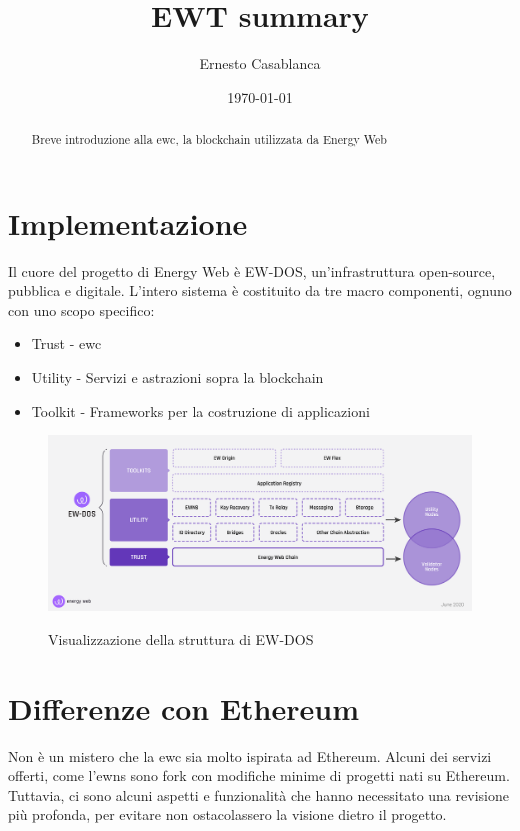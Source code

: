 \documentclass[12pt, letterpaper, twoside]{article}
\title{EWT summary}
\author{Ernesto Casablanca}
\date{\today}
\begin{document}
 
 
\tableofcontents
 
\newpage
 
\begin{abstract}
    Breve introduzione alla \gls{ewc}, la blockchain utilizzata da Energy Web
\end{abstract}

\section{Implementazione}
Il cuore del progetto di Energy Web è EW-DOS, un'infrastruttura open-source, pubblica e digitale.
L'intero sistema è costituito da tre macro componenti, ognuno con uno scopo specifico:

\begin{itemize}
    \item Trust - \gls{ewc}
    \item Utility - Servizi e astrazioni sopra la blockchain
    \item Toolkit - Frameworks per la costruzione di applicazioni
\end{itemize}

\begin{figure}[h]
    \includegraphics[width=13cm]{ew-dos}
    \centering
    \label{ew-dos}
    \caption{Visualizzazione della struttura di EW-DOS \cite{img:ew-dos}}
\end{figure}

\newpage
 
\section{Differenze con Ethereum}
Non è un mistero che la \gls{ewc} sia molto ispirata ad Ethereum.
Alcuni dei servizi offerti, come l'\gls{ewns} sono fork con modifiche minime di progetti nati su Ethereum. \\
Tuttavia, ci sono alcuni aspetti e funzionalità che hanno necessitato una revisione più profonda, per evitare non ostacolassero la visione dietro il progetto. \\
 
\end{document}
